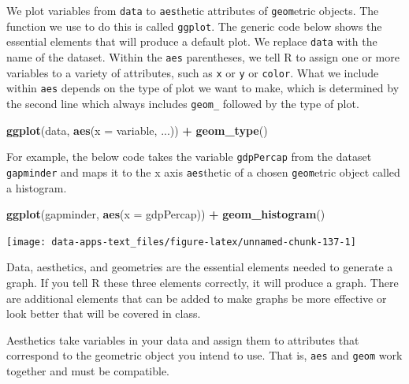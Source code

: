 \documentclass[
]{book}
\makeatletter
\newenvironment{Shaded}{\begin{snugshade}}{\end{snugshade}}
\newcommand{\AttributeTok}[1]{\textcolor[rgb]{0.27,0.27,0.27}{#1}}
\newcommand{\FunctionTok}[1]{\textcolor[rgb]{0.27,0.27,0.27}{\textbf{#1}}}
\newcommand{\NormalTok}[1]{#1}
\newcommand{\SpecialCharTok}[1]{\textcolor[rgb]{0.43,0.43,0.43}{\textbf{#1}}}
\newenvironment{kframe}{%
\medskip{}
\setlength{\fboxsep}{.8em}
 \def\at@end@of@kframe{}%
 \ifinner\ifhmode%
  \def\at@end@of@kframe{\end{minipage}}%
  \begin{minipage}{\columnwidth}%
 \fi\fi%
 \def\FrameCommand##1{\hskip\@totalleftmargin \hskip-\fboxsep
 \colorbox{shadecolor}{##1}\hskip-\fboxsep
     \hskip-\linewidth \hskip-\@totalleftmargin \hskip\columnwidth}%
 \MakeFramed {\advance\hsize-\width
   \@totalleftmargin\z@ \linewidth\hsize
   \@setminipage}}%
 {\par\unskip\endMakeFramed%
 \at@end@of@kframe}
\renewenvironment{Shaded}{\begin{kframe}}{\end{kframe}}
\makeatother
\begin{document}
We plot variables from \texttt{data} to \texttt{aes}thetic attributes of \texttt{geom}etric objects. The function we use to do this is called \texttt{ggplot}. The generic code below shows the essential elements that will produce a default plot. We replace \texttt{data} with the name of the dataset. Within the \texttt{aes} parentheses, we tell R to assign one or more variables to a variety of attributes, such as \texttt{x} or \texttt{y} or \texttt{color}. What we include within \texttt{aes} depends on the type of plot we want to make, which is determined by the second line which always includes \texttt{geom\_} followed by the type of plot.

\begin{Shaded}
\begin{Highlighting}[]
\FunctionTok{ggplot}\NormalTok{(data, }\FunctionTok{aes}\NormalTok{(}\AttributeTok{x =}\NormalTok{ variable, ...)) }\SpecialCharTok{+}
  \FunctionTok{geom\_type}\NormalTok{()}
\end{Highlighting}
\end{Shaded}

For example, the below code takes the variable \texttt{gdpPercap} from the dataset \texttt{gapminder} and maps it to the x axis \texttt{aes}thetic of a chosen \texttt{geom}etric object called a histogram.

\begin{Shaded}
\begin{Highlighting}[]
\FunctionTok{ggplot}\NormalTok{(gapminder, }\FunctionTok{aes}\NormalTok{(}\AttributeTok{x =}\NormalTok{ gdpPercap)) }\SpecialCharTok{+}
  \FunctionTok{geom\_histogram}\NormalTok{()}
\end{Highlighting}
\end{Shaded}

\begin{center}\texttt{[image: data-apps-text\_files/figure-latex/unnamed-chunk-137-1]} \end{center}

Data, aesthetics, and geometries are the essential elements needed to generate a graph. If you tell R these three elements correctly, it will produce a graph. There are additional elements that can be added to make graphs be more effective or look better that will be covered in class.

Aesthetics take variables in your data and assign them to attributes that correspond to the geometric object you intend to use. That is, \texttt{aes} and \texttt{geom} work together and must be compatible.
\end{document}
